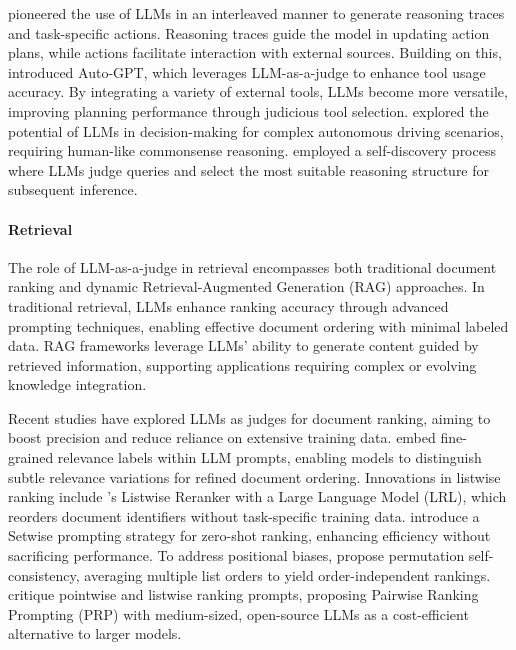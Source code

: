 \citet{yao2022react} pioneered the use of LLMs in an interleaved manner to generate reasoning traces and task-specific actions. Reasoning traces guide the model in updating action plans, while actions facilitate interaction with external sources. Building on this, \citet{yang2023auto} introduced Auto-GPT, which leverages LLM-as-a-judge to enhance tool usage accuracy. By integrating a variety of external tools, LLMs become more versatile, improving planning performance through judicious tool selection. \citet{sha2023languagempc} explored the potential of LLMs in decision-making for complex autonomous driving scenarios, requiring human-like commonsense reasoning. \citet{zhou2024self} employed a self-discovery process where LLMs judge queries and select the most suitable reasoning structure for subsequent inference.

\paragraph{\textbf{Retrieval}}
The role of LLM-as-a-judge in retrieval encompasses both traditional document ranking and dynamic Retrieval-Augmented Generation (RAG) approaches. In traditional retrieval, LLMs enhance ranking accuracy through advanced prompting techniques, enabling effective document ordering with minimal labeled data. RAG frameworks leverage LLMs' ability to generate content guided by retrieved information, supporting applications requiring complex or evolving knowledge integration.

Recent studies have explored LLMs as judges for document ranking, aiming to boost precision and reduce reliance on extensive training data. \citet{zhuang2024beyond} embed fine-grained relevance labels within LLM prompts, enabling models to distinguish subtle relevance variations for refined document ordering.
Innovations in listwise ranking include \citet{ma2023zero}'s Listwise Reranker with a Large Language Model (LRL), which reorders document identifiers without task-specific training data. \citet{zhuang2024setwise} introduce a Setwise prompting strategy for zero-shot ranking, enhancing efficiency without sacrificing performance. To address positional biases, \citet{tang2024found} propose permutation self-consistency, averaging multiple list orders to yield order-independent rankings. \citet{naacl_text_ranker} critique pointwise and listwise ranking prompts, proposing Pairwise Ranking Prompting (PRP) with medium-sized, open-source LLMs as a cost-efficient alternative to larger models.

